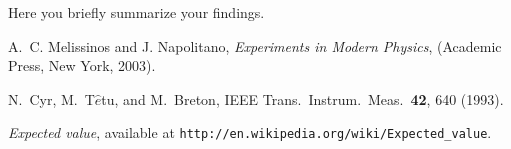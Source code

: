 \documentclass[letterpaper,12pt]{article}
\begin{document}
Here you briefly summarize your findings.


\begin{thebibliography}{99}

A.~C. Melissinos and J. Napolitano, \textit{Experiments in Modern Physics},
(Academic Press, New York, 2003).

N.\ Cyr, M.\ T$\hat{e}$tu, and M.\ Breton,
IEEE Trans.\ Instrum.\ Meas.\ \textbf{42}, 640 (1993).

 \emph{Expected value},  available at
\texttt{http://en.wikipedia.org/wiki/Expected\_value}.

\end{thebibliography}
\end{document}
